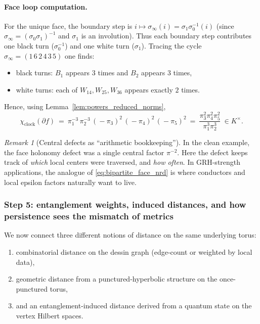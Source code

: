 \documentclass[11pt,oneside]{amsbook}
\numberwithin{equation}{section}
\theoremstyle{plain}
\theoremstyle{definition}
\theoremstyle{remark}
\newtheorem{remark}[theorem]{Remark}
\begin{document}
\paragraph{Face loop computation.}
For the unique face, the boundary step is $i\mapsto \sigma_\infty(i)=\sigma_1\sigma_0^{-1}(i)$ (since $\sigma_\infty=(\sigma_0\sigma_1)^{-1}$ and $\sigma_1$ is an involution).
Thus each boundary step contributes one black turn ($\sigma_0^{-1}$) and one white turn ($\sigma_1$).
Tracing the cycle $\sigma_\infty=(1\,6\,2\,4\,3\,5)$ one finds:
\begin{itemize}
\item black turns: $B_1$ appears $3$ times and $B_2$ appears $3$ times,
\item white turns: each of $W_{14},W_{25},W_{36}$ appears exactly $2$ times.
\end{itemize}
Hence, using Lemma~\ref{lem:powers_reduced_norms},
\begin{equation}
\label{eq:bipartite_face_nrd}
\chi_{\mathrm{clock}}(\partial f)\ =\ \pi_1^{-3}\,\pi_2^{-3}\,(\!-\pi_3)^{2}\,(\!-\pi_4)^{2}\,(\!-\pi_5)^{2}
\ =\ \frac{\pi_3^2\pi_4^2\pi_5^2}{\pi_1^3\pi_2^3}\ \in K^\times.
\end{equation}

\begin{remark}[Central defects as ``arithmetic bookkeeping'']
In the clean example, the face holonomy defect was a single central factor $\pi^{-2}$.
Here the defect keeps track of \emph{which} local centers were traversed, and \emph{how often}.
In GRH-strength applications, the analogue of \eqref{eq:bipartite_face_nrd} is where conductors and local epsilon factors naturally want to live.
\end{remark}

\subsubsection{Step 5: entanglement weights, induced distances, and how persistence sees the mismatch of metrics}

We now connect three different notions of distance on the same underlying torus:
\begin{enumerate}[label=(\alph*)]
\item combinatorial distance on the dessin graph (edge-count or weighted by local data),
\item geometric distance from a punctured-hyperbolic structure on the once-punctured torus,
\item and an entanglement-induced distance derived from a quantum state on the vertex Hilbert spaces.
\end{enumerate}
\end{document}
